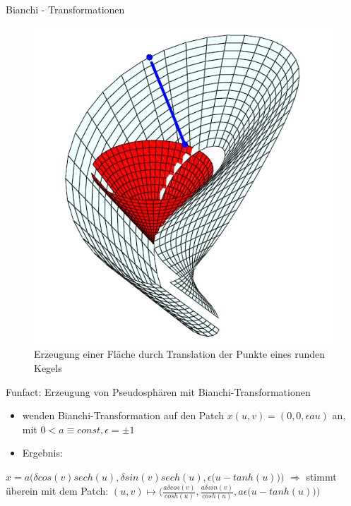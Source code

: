 \documentclass[12pt]{beamer}
\begin{document}
\begin{frame}{Bianchi - Transformationen}
\begin{figure}[h!]
\includegraphics[scale=0.5]{bianchi_transform_def.png}
\caption{Erzeugung einer Fläche durch Translation der Punkte eines runden Kegels}
\end{figure}

\end{frame}

\begin{frame}{Funfact: Erzeugung von Pseudosphären mit Bianchi-Transformationen}
\begin{itemize}
\item wenden Bianchi-Transformation auf den Patch $x(u,v) = (0,0,\epsilon au)$ an, mit $0 < a \equiv const, \epsilon = \pm1$
\item Ergebnis:
\end{itemize}
\centering $\hat{x} = a\Big (\delta cos(v) sech(u), \delta sin(v) sech(u), \epsilon\big(u-tanh(u)\big)\Big)$\newline\newline
$\Rightarrow$ stimmt überein mit dem Patch: \newline\newline
\centering
$(u,v) \mapsto \Big(\frac{a\delta cos(v)}{cosh(u)}, \frac{a\delta sin(v)}{cosh(u)}, a\epsilon\big(u - tanh(u)\big)\Big)$
\end{frame}
\end{document}
